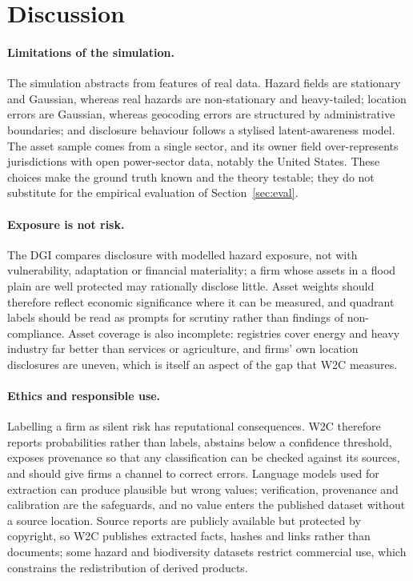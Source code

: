 \documentclass{article}
\theoremstyle{plain}
\theoremstyle{definition}
\begin{document}
\section{Discussion}
\label{sec:discussion}

\paragraph{Limitations of the simulation.} The simulation abstracts from features of real data. Hazard fields are stationary and Gaussian, whereas real hazards are non-stationary and heavy-tailed; location errors are Gaussian, whereas geocoding errors are structured by administrative boundaries; and disclosure behaviour follows a stylised latent-awareness model. The asset sample comes from a single sector, and its owner field over-represents jurisdictions with open power-sector data, notably the United States. These choices make the ground truth known and the theory testable; they do not substitute for the empirical evaluation of Section~\ref{sec:eval}.

\paragraph{Exposure is not risk.} The DGI compares disclosure with modelled hazard exposure, not with vulnerability, adaptation or financial materiality; a firm whose assets in a flood plain are well protected may rationally disclose little. Asset weights should therefore reflect economic significance where it can be measured, and quadrant labels should be read as prompts for scrutiny rather than findings of non-compliance. Asset coverage is also incomplete: registries cover energy and heavy industry far better than services or agriculture, and firms' own location disclosures are uneven, which is itself an aspect of the gap that W2C measures.

\paragraph{Ethics and responsible use.} Labelling a firm as silent risk has reputational consequences. W2C therefore reports probabilities rather than labels, abstains below a confidence threshold, exposes provenance so that any classification can be checked against its sources, and should give firms a channel to correct errors. Language models used for extraction can produce plausible but wrong values; verification, provenance and calibration are the safeguards, and no value enters the published dataset without a source location. Source reports are publicly available but protected by copyright, so W2C publishes extracted facts, hashes and links rather than documents; some hazard and biodiversity datasets restrict commercial use, which constrains the redistribution of derived products.
\end{document}
